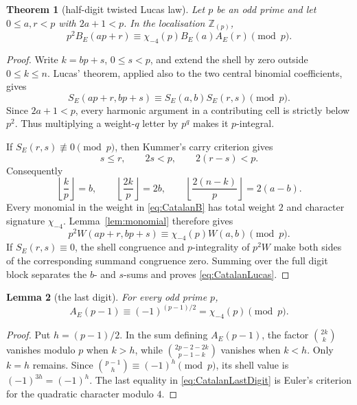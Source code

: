 \documentclass[11pt]{article}
\newtheorem{theorem}{Theorem}[section]
\newtheorem{lemma}[theorem]{Lemma}
\theoremstyle{definition}
\theoremstyle{remark}
\newcommand{\Zp}{\mathbb Z_{(p)}}
\begin{document}
\begin{theorem}[half-digit twisted Lucas law]\label{thm:CatalanLucas}
Let $p$ be an odd prime and let $0\le a,r<p$ with $2a+1<p$.  In the localisation
$\Zp$,
\begin{equation}\label{eq:CatalanLucas}
 p^2B_E(ap+r)\equiv
 \chi_{-4}(p)B_E(a)A_E(r)\pmod p.
\end{equation}
\end{theorem}

\begin{proof}
Write $k=bp+s$, $0\le s<p$, and extend the shell by zero outside $0\le k\le n$.
Lucas' theorem, applied also to the two central binomial coefficients, gives
\[
 S_E(ap+r,bp+s)\equiv S_E(a,b)S_E(r,s)\pmod p.
\]
Since $2a+1<p$, every harmonic argument in a contributing cell is strictly below
$p^2$.  Thus multiplying a weight-$q$ letter by $p^q$ makes it $p$-integral.

If $S_E(r,s)\not\equiv0\pmod p$, then Kummer's carry criterion gives
\[
 s\le r,\qquad 2s<p,\qquad 2(r-s)<p.
\]
Consequently
\[
 \left\lfloor\frac{k}{p}\right\rfloor=b,\qquad
 \left\lfloor\frac{2k}{p}\right\rfloor=2b,\qquad
 \left\lfloor\frac{2(n-k)}p\right\rfloor=2(a-b).
\]
Every monomial in the weight in \eqref{eq:CatalanB} has total weight $2$ and character
signature $\chi_{-4}$.  Lemma~\ref{lem:monomial} therefore gives
\[
 p^2W(ap+r,bp+s)\equiv\chi_{-4}(p)W(a,b)\pmod p.
\]
If $S_E(r,s)\equiv0$, the shell congruence and $p$-integrality of $p^2W$ make both
sides of the corresponding summand congruence zero.  Summing over the full digit block
separates the $b$- and $s$-sums and proves \eqref{eq:CatalanLucas}.
\end{proof}

\begin{lemma}[the last digit]\label{lem:CatalanLastDigit}
For every odd prime $p$,
\begin{equation}\label{eq:CatalanLastDigit}
 A_E(p-1)\equiv(-1)^{(p-1)/2}=\chi_{-4}(p)\pmod p.
\end{equation}
\end{lemma}

\begin{proof}
Put $h=(p-1)/2$.  In the sum defining $A_E(p-1)$, the factor
$\binom{2k}{k}$ vanishes modulo $p$ when $k>h$, while
$\binom{2p-2-2k}{p-1-k}$ vanishes when $k<h$.  Only $k=h$ remains.  Since
$\binom{p-1}{h}\equiv(-1)^h\pmod p$, its shell value is
$(-1)^{3h}=(-1)^h$.  The last equality in \eqref{eq:CatalanLastDigit} is Euler's
criterion for the quadratic character modulo $4$.
\end{proof}
\end{document}
